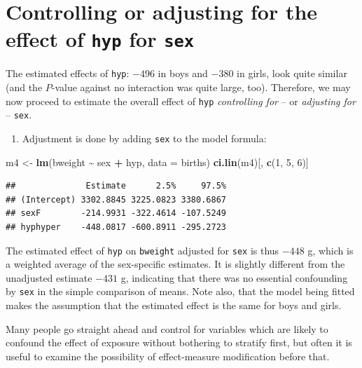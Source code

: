 \documentclass[
]{book}
\newenvironment{Shaded}{\begin{snugshade}}{\end{snugshade}}
\newcommand{\AttributeTok}[1]{\textcolor[rgb]{0.13,0.29,0.53}{#1}}
\newcommand{\DecValTok}[1]{\textcolor[rgb]{0.00,0.00,0.81}{#1}}
\newcommand{\FunctionTok}[1]{\textcolor[rgb]{0.13,0.29,0.53}{\textbf{#1}}}
\newcommand{\NormalTok}[1]{#1}
\newcommand{\OtherTok}[1]{\textcolor[rgb]{0.56,0.35,0.01}{#1}}
\newcommand{\SpecialCharTok}[1]{\textcolor[rgb]{0.81,0.36,0.00}{\textbf{#1}}}
\providecommand{\tightlist}{%
  \setlength{\itemsep}{0pt}\setlength{\parskip}{0pt}}
\begin{document}
\section{\texorpdfstring{Controlling or adjusting for the effect of \texttt{hyp} for \texttt{sex}}{Controlling or adjusting for the effect of hyp for sex}}\label{controlling-or-adjusting-for-the-effect-of-hyp-for-sex}

The estimated effects of \texttt{hyp}:
\(-496\) in boys and \(-380\) in girls, look quite
similar (and the \(P\)-value against no interaction was quite large, too).
Therefore, we may now proceed to estimate the overall effect of \texttt{hyp}
\emph{controlling for} -- or \emph{adjusting for} -- \texttt{sex}.

\begin{enumerate}
\def\labelenumi{\arabic{enumi}.}
\tightlist
\item
  Adjustment is done by adding \texttt{sex} to the model formula:
\end{enumerate}

\begin{Shaded}
\begin{Highlighting}[]
\NormalTok{m4 }\OtherTok{\textless{}{-}} \FunctionTok{lm}\NormalTok{(bweight }\SpecialCharTok{\textasciitilde{}}\NormalTok{ sex }\SpecialCharTok{+}\NormalTok{ hyp, }\AttributeTok{data =}\NormalTok{ births)}
\FunctionTok{ci.lin}\NormalTok{(m4)[, }\FunctionTok{c}\NormalTok{(}\DecValTok{1}\NormalTok{, }\DecValTok{5}\NormalTok{, }\DecValTok{6}\NormalTok{)]}
\end{Highlighting}
\end{Shaded}

\begin{verbatim}
##              Estimate      2.5%     97.5%
## (Intercept) 3302.8845 3225.0823 3380.6867
## sexF        -214.9931 -322.4614 -107.5249
## hyphyper    -448.0817 -600.8911 -295.2723
\end{verbatim}

The estimated effect of \texttt{hyp} on \texttt{bweight}
adjusted for \texttt{sex} is thus \(-448\) g,
which is a weighted average of the sex-specific estimates.
It is slightly different from the unadjusted estimate \(-431\) g, indicating
that there was no essential confounding by \texttt{sex} in the
simple comparison of means.
Note also, that the model being fitted makes the assumption that
the estimated effect is the same for boys and girls.

Many people go straight ahead and control for variables which are likely to
confound the effect of exposure without bothering to stratify first,
but often it is useful to examine the possibility of effect-measure
modification before that.
\end{document}
